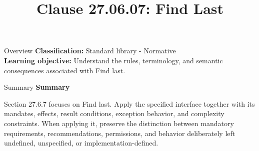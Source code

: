 \documentclass[10pt,letterpaper]{article}
\title{Clause 27.06.07: Find Last}
\author{}
\date{}
\begin{document}
\maketitle
\begin{CornellOverviewBox}{Overview}
\textbf{Classification:} Standard library - Normative\\[2pt]
\textbf{Learning objective:} Understand the rules, terminology, and semantic consequences associated with Find last.
\end{CornellOverviewBox}\begin{CornellSummaryBox}{Summary}
{\sffamily\bfseries\color{Accent} Summary}\par\vspace{3pt}Section 27.6.7 focuses on Find last. Apply the specified interface together with its mandates, effects, result conditions, exception behavior, and complexity constraints. When applying it, preserve the distinction between mandatory requirements, recommendations, permissions, and behavior deliberately left undefined, unspecified, or implementation-defined.
\end{CornellSummaryBox}
\end{document}
